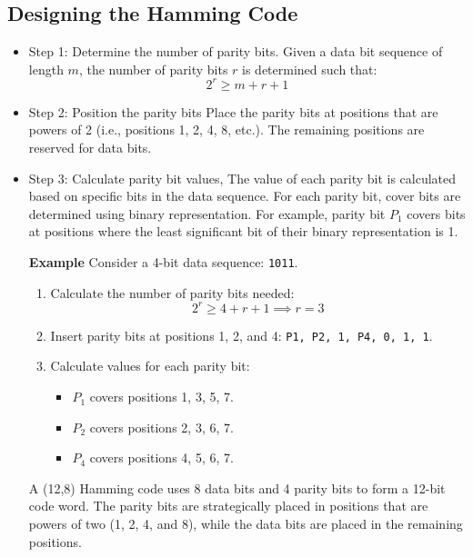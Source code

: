 \documentclass{article}
\begin{document}
\subsection{Designing the Hamming Code}
\begin{itemize}

\item {Step 1: Determine the number of parity bits.}
Given a data bit sequence of length \(m\), the number of parity bits \(r\) is determined such that:
\begin{equation}
2^r \geq m + r + 1
\end{equation}

\item  {Step 2: Position the parity bits}
Place the parity bits at positions that are powers of 2 (i.e., positions 1, 2, 4, 8, etc.). The remaining positions are reserved for data bits.

\item {Step 3: Calculate parity bit values,}
The value of each parity bit is calculated based on specific bits in the data sequence. For each parity bit, cover bits are determined using binary representation. For example, parity bit \(P_1\) covers bits at positions where the least significant bit of their binary representation is 1.

\textbf{Example}
Consider a 4-bit data sequence: \texttt{1011}.

\begin{enumerate}
    \item Calculate the number of parity bits needed:
    \begin{equation}
    2^r \geq 4 + r + 1 \implies r = 3
    \end{equation}
    \item Insert parity bits at positions 1, 2, and 4: \texttt{P1, P2, 1, P4, 0, 1, 1}.
    \item Calculate values for each parity bit:
    \begin{itemize}
        \item \(P_1\) covers positions 1, 3, 5, 7.
        \item \(P_2\) covers positions 2, 3, 6, 7.
        \item \(P_4\) covers positions 4, 5, 6, 7.
    \end{itemize}
\end{enumerate}






A (12,8) Hamming code uses 8 data bits and 4 parity bits to form a 12-bit code word. The parity bits are strategically placed in positions that are powers of two (1, 2, 4, and 8), while the data bits are placed in the remaining positions.\cite{khadir}
\end{itemize}
\end{document}
